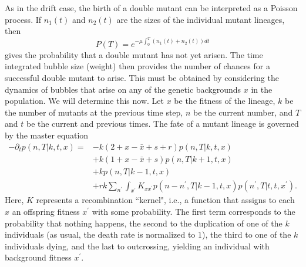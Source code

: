 \documentclass[10pt]{revtex4}
\begin{document}
As in the drift case, the birth of a double mutant can be interpreted as a Poisson process. If $n_1(t)$ and $n_2(t)$ are the sizes of the individual mutant lineages, then
\begin{equation}
P(T) = e^{-\mu \int_0^T (n_1(t) + n_2(t)) dt}
\end{equation}
gives the probability that a double mutant has not yet arisen.
The time integrated bubble size (weight) then provides the number of chances for a successful double mutant to arise.
This must be obtained by considering the dynamics of bubbles that arise on any of the genetic backgrounds $x$ in the population.
We will determine this now.
Let $x$ be the fitness of the lineage, $k$ be the number of mutants at the previous time step, $n$ be the current number, and $T$ and $t$ be the current and previous times.
The fate of a mutant lineage is governed by the master equation
\begin{align*}
-\partial_t p(n,T|k,t,x) = &-k(2+x-\bar{x}+s+r)p(n,T|k,t,x) \\
& + k(1+x-\bar{x}+s)p(n,T|k+1,t,x) \\
& +kp(n,T|k-1,t,x) \\
&+rk\sum_{n^\prime} \int_{x^\prime} K_{x x^\prime} p(n-n^\prime , T|k-1, t, x) p(n^\prime,T|t,t,x^\prime).
\end{align*}
Here, $K$ represents a recombination ``kernel", i.e., a function that assigns to each $x$ an offspring fitness $x^\prime$ with some probability.
The first term corresponds to the probability that nothing happens, the second to the duplication of one of the $k$ individuals (as usual, the death rate is normalized to $1$), the third to one of the $k$ individuals dying, and the last to outcrossing, yielding an individual with background fitness $x^\prime$.
\end{document}
